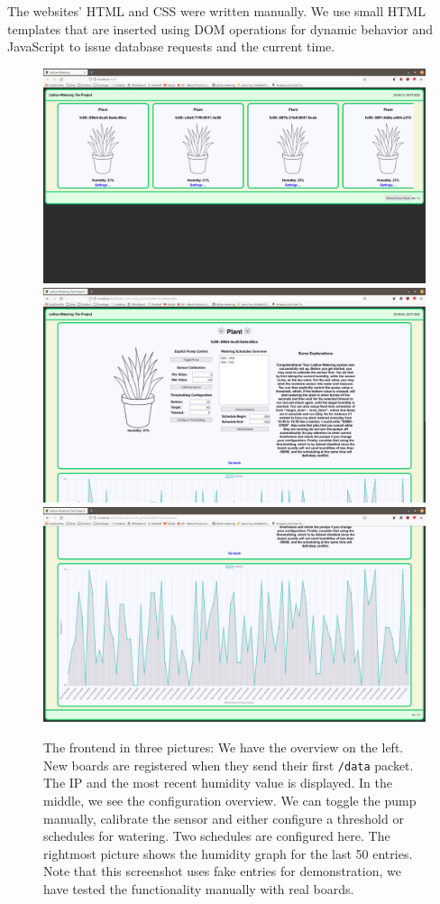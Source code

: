 \documentclass[acmtog, language=english, nonacm]{acmart}
\begin{document}
    The websites' HTML and CSS were written manually. We use small HTML templates that are inserted using DOM operations for dynamic behavior and JavaScript to issue database requests and the current time.

    \begin{figure}[!hbtp]
        \centering
        \includegraphics[width=0.32\linewidth]{img/frontend_1.png}
        \includegraphics[width=0.32\linewidth]{img/frontend_2.png}
        \includegraphics[width=0.32\linewidth]{img/frontend_3.png}
        \caption{The frontend in three pictures: We have the overview on the left. New boards are registered when they send their first \texttt{/data} packet. The IP and the most recent humidity value is displayed. In the middle, we see the configuration overview. We can toggle the pump manually, calibrate the sensor and either configure a threshold or schedules for watering. Two schedules are configured here. The rightmost picture shows the humidity graph for the last 50 entries. Note that this screenshot uses fake entries for demonstration, we have tested the functionality manually with real boards.}
        \label{fig:the_frontend_in_three_pictures}
    \end{figure}
\end{document}

